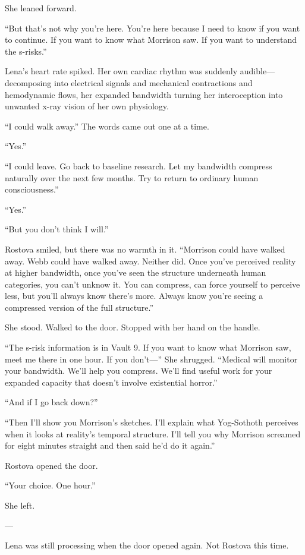 She leaned forward.

``But that's not why you're here. You're here because I need to know if you want to continue. If you want to know what Morrison saw. If you want to understand the s-risks.''

Lena's heart rate spiked. Her own cardiac rhythm was suddenly audible—decomposing into electrical signals and mechanical contractions and hemodynamic flows, her expanded bandwidth turning her interoception into unwanted x-ray vision of her own physiology.

``I could walk away.'' The words came out one at a time.

``Yes.''

``I could leave. Go back to baseline research. Let my bandwidth compress naturally over the next few months. Try to return to ordinary human consciousness.''

``Yes.''

``But you don't think I will.''

Rostova smiled, but there was no warmth in it. ``Morrison could have walked away. Webb could have walked away. Neither did. Once you've perceived reality at higher bandwidth, once you've seen the structure underneath human categories, you can't unknow it. You can compress, can force yourself to perceive less, but you'll always know there's more. Always know you're seeing a compressed version of the full structure.''

She stood. Walked to the door. Stopped with her hand on the handle.

``The s-risk information is in Vault 9. If you want to know what Morrison saw, meet me there in one hour. If you don't—'' She shrugged. ``Medical will monitor your bandwidth. We'll help you compress. We'll find useful work for your expanded capacity that doesn't involve existential horror.''

``And if I go back down?''

``Then I'll show you Morrison's sketches. I'll explain what Yog-Sothoth perceives when it looks at reality's temporal structure. I'll tell you why Morrison screamed for eight minutes straight and then said he'd do it again.''

Rostova opened the door.

``Your choice. One hour.''

She left.

---

Lena was still processing when the door opened again. Not Rostova this time.

